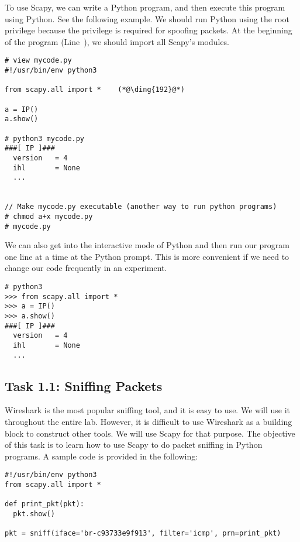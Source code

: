 To use Scapy, we can write a Python program, and then execute this program
using Python. See the following example. We should run Python using the 
root privilege because the privilege is required for spoofing packets. 
At the beginning of the program (Line~), 
we should import all Scapy's modules.

\begin{lstlisting}
# view mycode.py
#!/usr/bin/env python3

from scapy.all import *    (*@\ding{192}@*)

a = IP()
a.show()

# python3 mycode.py
###[ IP ]###
  version   = 4
  ihl       = None
  ...


// Make mycode.py executable (another way to run python programs)
# chmod a+x mycode.py
# mycode.py 
\end{lstlisting}


We can also get into the interactive mode of Python and
then run our program one line at a time at the Python prompt. 
This is more convenient if we need to change our code 
frequently in an experiment.

\begin{lstlisting}
# python3
>>> from scapy.all import *
>>> a = IP()
>>> a.show()
###[ IP ]###
  version   = 4
  ihl       = None
  ...
\end{lstlisting}
 

\subsection{Task 1.1: Sniffing Packets}  


Wireshark is the most popular sniffing tool, and it is easy to use. We will use it throughout 
the entire lab. However, it is difficult to use Wireshark as a building block 
to construct other tools. We will use Scapy for that purpose. The objective of this task is to
learn how to use Scapy to do packet sniffing in Python programs. 
A sample code is provided in the following:


\begin{lstlisting}
#!/usr/bin/env python3
from scapy.all import *

def print_pkt(pkt):
  pkt.show()

pkt = sniff(iface='br-c93733e9f913', filter='icmp', prn=print_pkt)
\end{lstlisting}


